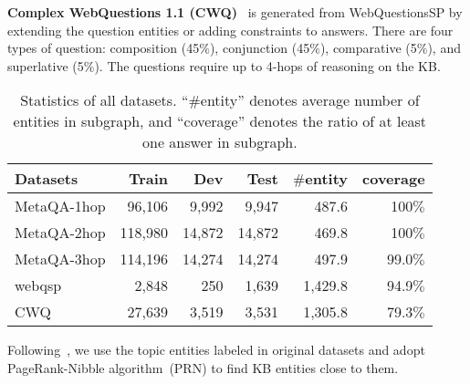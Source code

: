 \textbf{Complex WebQuestions 1.1 (CWQ)}~\citep{CWQ-NAACL-2018} is generated from WebQuestionsSP by extending the question entities or adding constraints to answers. There are four types of question: composition (45$\%$), conjunction (45$\%$), comparative (5$\%$), and superlative (5$\%$). The questions require up to 4-hops of reasoning on the KB. 
\begin{table}[!h]
	\centering
	\caption{Statistics of all datasets. ``$\#$entity'' denotes average number of entities in subgraph, and ``coverage'' denotes the ratio of at least one answer in subgraph.}
	\label{tab:datasets}\begin{tabular}{l | r r r | r r}
\hline
			Datasets		&	Train&	Dev&	Test&	$\#$entity& coverage\\
		\hline
		MetaQA-1hop	&	96,106&	9,992&	 9,947&	487.6&	100$\%$\\
		MetaQA-2hop	&	118,980&	14,872&	 14,872&	469.8&	100$\%$\\
		MetaQA-3hop	&	114,196&	14,274&	 14,274&	497.9&	99.0$\%$\\
		webqsp	&	 2,848&	 250&	  1,639&	1,429.8&	94.9$\%$\\
		CWQ	&	27,639&	3,519&	  3,531&	1,305.8&	79.3$\%$\\
		\hline
	\end{tabular}\end{table}Following~\citep{GraftNet-EMNLP-2018,PullNet-EMNLP-2019}, we use the topic entities labeled in original datasets and adopt PageRank-Nibble algorithm~(PRN) \citep{PPR-Andersen-2006} to find KB entities close to them.
